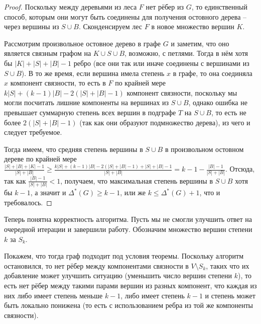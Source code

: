 \documentclass[a4paper,11pt]{article}
\renewcommand{\le}{\ensuremath{\leqslant}}
\renewcommand{\ge}{\ensuremath{\geqslant}}
\theoremstyle{plain}
\theoremstyle{definition}
\theoremstyle{remark}
\begin{document}
\begin{proof}

Поскольку между деревьями из леса $F$ нет рёбер из $G$, то единственный способ, которым они могут быть соединены для получения остовного дерева -- через вершины из $S \cup B$. Сконденсируем лес $F$ в новое множество вершин $K$.

Рассмотрим произвольное остовное дерево в графе $G$ и заметим, что оно является связным графом на $K \cup S \cup B$, возможно, с петлями. Тогда в нём хотя бы $|K| + |S| + |B| - 1$ ребро (все они так или иначе соединены с вершинами из $S \cup B$). В то же время, если вершина имела степень $x$ в графе, то она соединяла $x$ компонент связности, то есть в $F$ по крайней мере $k |S| + (k-1) |B| - 2(|S| + |B| - 1)$ компонент связности, поскольку мы могли посчитать лишние компоненты на вершинах из $S \cup B$, однако ошибка не превышает суммарную степень всех вершин в подграфе $T$ на $S \cup B$, то есть не более $2(|S| + |B| - 1)$ (так как они образуют подмножество дерева), из чего и следует требуемое.

Тогда имеем, что средняя степень вершины в $S \cup B$ в произвольном остовном дереве по крайней мере $\frac{|S| + |B| + |K| - 1}{|S| + |B|} \ge \frac{k |S| + (k - 1) |B|  - 2 (|S| + |B| - 1) + |S| + |B| - 1}{|S| + |B|} = k - 1 - \frac{|B| - 1}{|S| + |B|}$. Отсюда, так как $\frac{|B| - 1}{|S| + |B|} < 1$, получаем, что максимальная степень вершины в $S \cup B$ хотя бы $k - 1$, а значит и $\Delta^*(G) \ge k - 1$, или же $k \le \Delta^*(G) + 1$, что и требовалось.

\end{proof}

Теперь понятна корректность алгоритма. Пусть мы не смогли улучшить ответ на очередной итерации и завершили работу. Обозначим множество вершин степени $k$ за $S_k$.

Покажем, что тогда граф подходит под условия теоремы. Поскольку алгоритм остановился, то нет рёбер между компонентами связности в $V \setminus S_k$, таких что их добавление может улучшить ситуацию (уменьшить число вершин степени $k$), то есть нет рёбер между такими парами вершин из разных компонент, что каждая из них либо имеет степень меньше $k-1$, либо имеет степень $k-1$ и степень может быть локально понижена (то есть с использованием ребра из той же компоненты связности).
\end{document}
